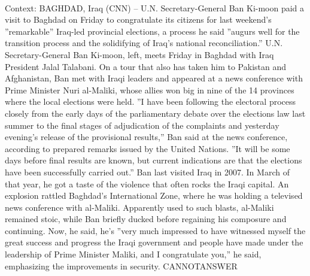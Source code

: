 \documentclass[11pt,a4paper, onecolumn]{article}
\begin{document}
\\ Context: BAGHDAD, Iraq (CNN) -- U.N. Secretary-General Ban Ki-moon paid a visit to Baghdad on Friday to congratulate its citizens for last weekend's ''remarkable'' Iraq-led provincial elections, a process he said ''augurs well for the transition process and the solidifying of Iraq's national reconciliation.'' U.N. Secretary-General Ban Ki-moon, left, meets Friday in Baghdad with Iraq President Jalal Talabani. On a tour that also has taken him to Pakistan and Afghanistan, Ban met with Iraqi leaders and appeared at a news conference with Prime Minister Nuri al-Maliki, whose allies won big in nine of the 14 provinces where the local elections were held. ''I have been following the electoral process closely from the early days of the parliamentary debate over the elections law last summer to the final stages of adjudication of the complaints and yesterday evening's release of the provisional results,'' Ban said at the news conference, according to prepared remarks issued by the United Nations. ''It will be some days before final results are known, but current indications are that the elections have been successfully carried out.'' Ban last visited Iraq in 2007. In March of that year, he got a taste of the violence that often rocks the Iraqi capital. An explosion rattled Baghdad's International Zone, where he was holding a televised news conference with al-Maliki. Apparently used to such blasts, al-Maliki remained stoic, while Ban briefly ducked before regaining his composure and continuing. Now, he said, he's ''very much impressed to have witnessed myself the great success and progress the Iraqi government and people have made under the leadership of Prime Minister Maliki, and I congratulate you,'' he said, emphasizing the improvements in security. CANNOTANSWER
\end{document}
